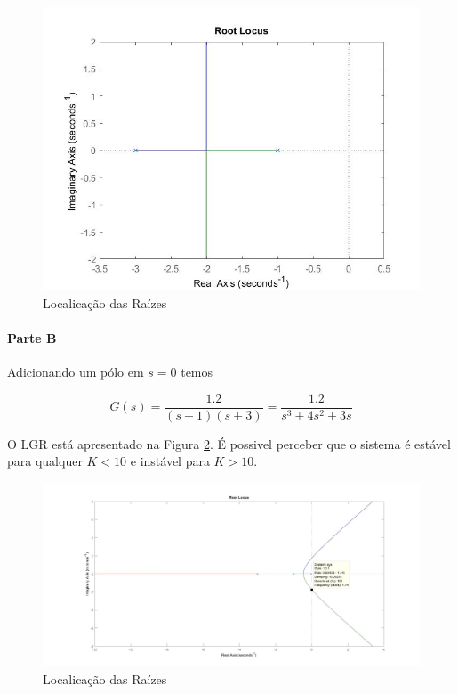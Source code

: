 \documentclass[
]{book}
\theoremstyle{definition}
\theoremstyle{definition}
\theoremstyle{definition}
\theoremstyle{remark}
\begin{document}
\begin{figure}

{\centering \includegraphics{Imagens/Lab8/Resolução/fig6} 

}

\caption{Localicação das Raízes}\label{fig:fig8R6}
\end{figure}

\hypertarget{parte-b-12}{%
\paragraph{Parte B}\label{parte-b-12}}

Adicionando um pólo em \(s=0\) temos

\[
G(s) = \frac{1.2}{(s+1)(s+3)} = \frac{1.2}{s^3+4s^2+3s}
\]

O LGR está apresentado na Figura \ref{fig:fig8R61}. É possivel perceber que o sistema é estável para qualquer \(K < 10\) e instável para \(K > 10\).

\begin{figure}

{\centering \includegraphics{Imagens/Lab8/Resolução/fig61} 

}

\caption{Localicação das Raízes}\label{fig:fig8R61}
\end{figure}
\end{document}
